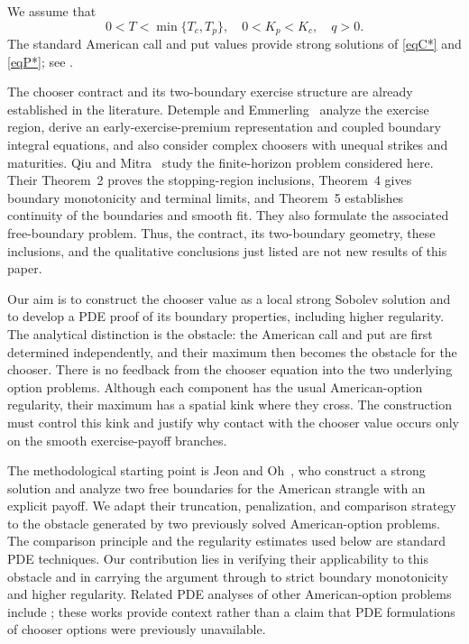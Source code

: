 \documentclass[11pt, a4paper, leqno]{amsart}
\numberwithin{equation}{section}
\theoremstyle{plain}
\theoremstyle{definition}
\theoremstyle{remark}
\begin{document}
{We assume that}
\begin{equation*}
    0<T < \min\{T_c,T_p\}, \quad 0<K_p<K_c,\quad {q>0}.
\end{equation*}
{The standard American call and put values provide strong
solutions of \eqref{eqC*} and \eqref{eqP*}; see \cite{ZF09,ZF09-1}.}

{
The chooser contract and its two-boundary exercise structure are already
established in the literature. Detemple and Emmerling~\cite{DETEMPLE09}
analyze the exercise region, derive an early-exercise-premium representation
and coupled boundary integral equations, and also consider complex choosers
with unequal strikes and maturities. Qiu and Mitra~\cite{Qiu2018} study
the finite-horizon problem considered here. Their Theorem~2 proves the
stopping-region inclusions, Theorem~4 gives boundary monotonicity and
terminal limits, and Theorem~5 establishes continuity of the boundaries
and smooth fit. They also formulate the associated free-boundary problem.
Thus, the contract, its two-boundary geometry, these inclusions, and the
qualitative conclusions just listed are not new results of this paper.

Our aim is to construct the chooser value as a local strong Sobolev solution
and to develop a PDE proof of its boundary properties, including higher
regularity. The analytical distinction is the obstacle: the American call
and put are first determined independently, and their maximum then becomes
the obstacle for the chooser. There is no feedback from the chooser equation
into the two underlying option problems. Although each component has the
usual American-option regularity, their maximum has a spatial kink where
they cross. The construction must control this kink and justify why contact
with the chooser value occurs only on the smooth exercise-payoff branches.

The methodological starting point is Jeon and Oh~\cite{JJ19}, who construct
a strong solution and analyze two free boundaries for the American strangle
with an explicit payoff. We adapt their truncation, penalization, and
comparison strategy to the obstacle generated by two previously solved
American-option problems. The comparison principle and the regularity
estimates used below are standard PDE techniques. Our contribution lies
in verifying their applicability to this obstacle and in carrying the
argument through to strict boundary monotonicity and higher regularity.
Related PDE analyses of other American-option problems include
\cite{Jiang2002,Rapuch2005,KarlsenWallin2009,QinChenLaiYu2015}; these works
provide context rather than a claim that PDE formulations of chooser
options were previously unavailable.

}
\end{document}
